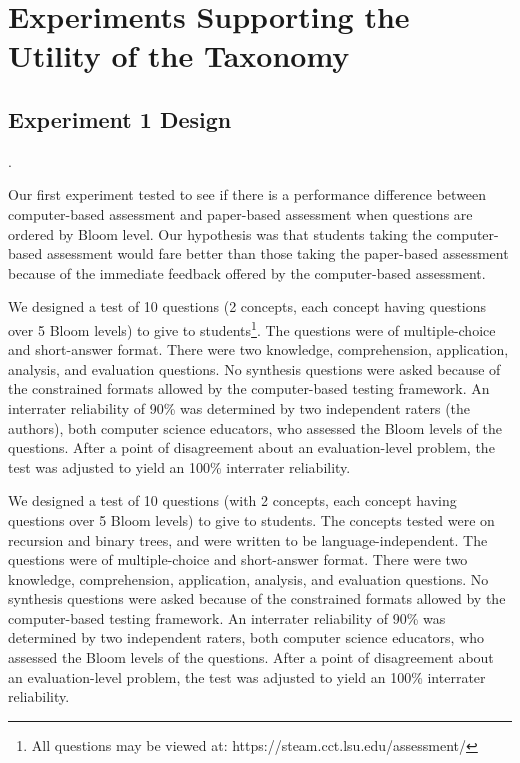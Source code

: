 \section{Experiments Supporting the Utility of the Taxonomy}
\label{sec:experiments}

\subsection{Experiment 1 Design}. 

Our first experiment tested to see if there is a performance difference between
computer-based assessment and paper-based assessment when questions are ordered
by Bloom level.  Our hypothesis was that students taking the computer-based
assessment would fare better than those taking the paper-based assessment
because of the immediate feedback offered by the computer-based assessment.

We designed a test of 10 questions (2 concepts, each concept having questions
over 5 Bloom levels) to give to students\footnote{All questions may be viewed
at: https://steam.cct.lsu.edu/assessment/}. The questions were of
multiple-choice and short-answer format.  There were two knowledge,
comprehension, application, analysis, and evaluation questions.  No synthesis
questions were asked because of the constrained formats allowed by the
computer-based testing framework.  An interrater reliability of 90\% was
determined by two independent raters (the authors), both computer science
educators, who assessed the Bloom levels of the questions.  After a point of
disagreement about an evaluation-level problem, the test was adjusted to yield
an 100\% interrater reliability.

We designed a test of 10 questions (with 2 concepts, each concept having
questions over 5 Bloom levels) to give to students. The concepts tested were on
recursion and binary trees, and were written to be language-independent.  The
questions were of multiple-choice and short-answer format.  There were two
knowledge, comprehension, application, analysis, and evaluation questions.  No
synthesis questions were asked because of the constrained formats allowed by
the computer-based testing framework.  An interrater reliability of 90\% was
determined by two independent raters, both computer science educators, who
assessed the Bloom levels of the questions.  After a point of disagreement
about an evaluation-level problem, the test was adjusted to yield an 100\%
interrater reliability.

